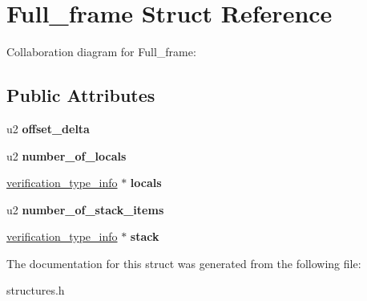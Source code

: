 \hypertarget{structFull__frame}{}\section{Full\+\_\+frame Struct Reference}
\label{structFull__frame}


Collaboration diagram for Full\+\_\+frame\+:
\subsection*{Public Attributes}
\begin{DoxyCompactItemize}
\item 
u2 {\bfseries offset\+\_\+delta}\hypertarget{structFull__frame_a2f561b5115209c671be0395a95a53dd5}{}\label{structFull__frame_a2f561b5115209c671be0395a95a53dd5}

\item 
u2 {\bfseries number\+\_\+of\+\_\+locals}\hypertarget{structFull__frame_a71a6efd7eaea7f6eb0ad1de7c70b4245}{}\label{structFull__frame_a71a6efd7eaea7f6eb0ad1de7c70b4245}

\item 
\hyperlink{structverification__type__info}{verification\+\_\+type\+\_\+info} $\ast$ {\bfseries locals}\hypertarget{structFull__frame_a12b01bc78373d145cbae4553a7c9b6a5}{}\label{structFull__frame_a12b01bc78373d145cbae4553a7c9b6a5}

\item 
u2 {\bfseries number\+\_\+of\+\_\+stack\+\_\+items}\hypertarget{structFull__frame_a11b6e1548b1ca3c416abc3fa6c3d3935}{}\label{structFull__frame_a11b6e1548b1ca3c416abc3fa6c3d3935}

\item 
\hyperlink{structverification__type__info}{verification\+\_\+type\+\_\+info} $\ast$ {\bfseries stack}\hypertarget{structFull__frame_a40ff4ea967461300e1ce8dbb51e28fa0}{}\label{structFull__frame_a40ff4ea967461300e1ce8dbb51e28fa0}

\end{DoxyCompactItemize}


The documentation for this struct was generated from the following file\+:\begin{DoxyCompactItemize}
\item 
structures.\+h\end{DoxyCompactItemize}
